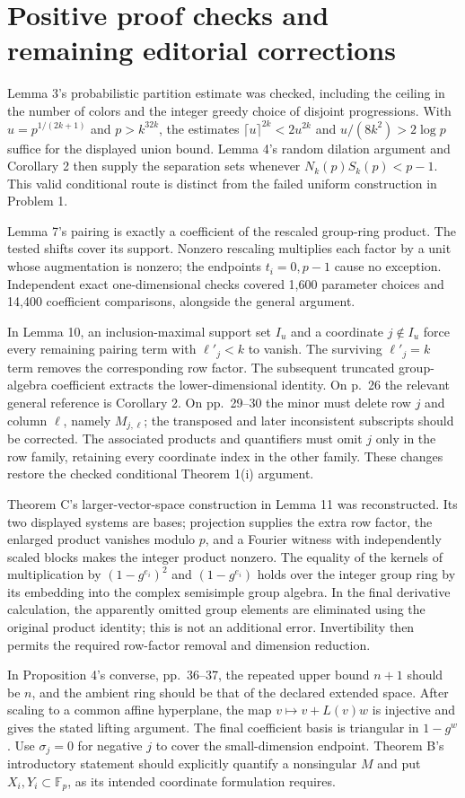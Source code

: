 \documentclass[10pt]{article}
\begin{document}
\section*{Positive proof checks and remaining editorial corrections}
Lemma 3’s probabilistic partition estimate was checked, including the ceiling in the number of colors and the integer greedy choice of disjoint progressions. With \(u=p^{1/(2k+1)}\) and \(p>k^{32k}\), the estimates \(\lceil u\rceil^{2k}<2u^{2k}\) and \(u/(8k^2)>2\log p\) suffice for the displayed union bound. Lemma 4’s random dilation argument and Corollary 2 then supply the separation sets whenever \(N_k(p)S_k(p)<p-1\). This valid conditional route is distinct from the failed uniform construction in Problem 1.\par
Lemma 7’s pairing is exactly a coefficient of the rescaled group-ring product. The tested shifts cover its support. Nonzero rescaling multiplies each factor by a unit whose augmentation is nonzero; the endpoints \(t_i=0,p-1\) cause no exception. Independent exact one-dimensional checks covered 1,600 parameter choices and 14,400 coefficient comparisons, alongside the general argument.\par
In Lemma 10, an inclusion-maximal support set \(I_u\) and a coordinate \(j\notin I_u\) force every remaining pairing term with \(\ell'_j<k\) to vanish. The surviving \(\ell'_j=k\) term removes the corresponding row factor. The subsequent truncated group-algebra coefficient extracts the lower-dimensional identity. On p. 26 the relevant general reference is Corollary 2. On pp. 29–30 the minor must delete row \(j\) and column \(\ell\), namely \(M_{j,\ell}\); the transposed and later inconsistent subscripts should be corrected. The associated products and quantifiers must omit \(j\) only in the row family, retaining every coordinate index in the other family. These changes restore the checked conditional Theorem 1(i) argument.\par
Theorem C’s larger-vector-space construction in Lemma 11 was reconstructed. Its two displayed systems are bases; projection supplies the extra row factor, the enlarged product vanishes modulo \(p\), and a Fourier witness with independently scaled blocks makes the integer product nonzero. The equality of the kernels of multiplication by \((1-g^{e_i})^2\) and \((1-g^{e_i})\) holds over the integer group ring by its embedding into the complex semisimple group algebra. In the final derivative calculation, the apparently omitted group elements are eliminated using the original product identity; this is not an additional error. Invertibility then permits the required row-factor removal and dimension reduction.\par
In Proposition 4’s converse, pp. 36–37, the repeated upper bound \(n+1\) should be \(n\), and the ambient ring should be that of the declared extended space. After scaling to a common affine hyperplane, the map \(v\mapsto v+L(v)w\) is injective and gives the stated lifting argument. The final coefficient basis is triangular in \(1-g^w\). Use \(\sigma_j=0\) for negative \(j\) to cover the small-dimension endpoint. Theorem B’s introductory statement should explicitly quantify a nonsingular \(M\) and put \(X_i,Y_i\subset\mathbb F_p\), as its intended coordinate formulation requires.\par
\end{document}
